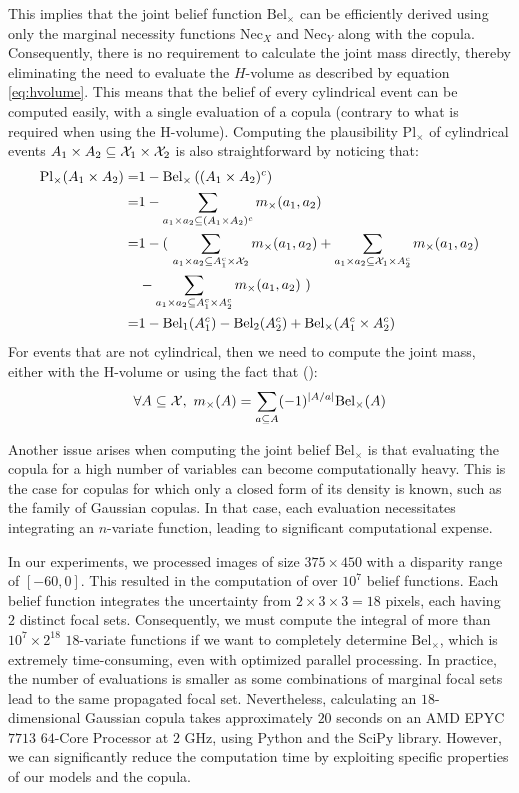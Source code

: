 This implies that the joint belief function $\mathrm{Bel}_\times$ can be efficiently derived using only the marginal necessity functions $\mathrm{Nec}_X$ and $\mathrm{Nec}_Y$ along with the copula. Consequently, there is no requirement to calculate the joint mass directly, thereby eliminating the need to evaluate the $H$-volume as described by equation \eqref{eq:hvolume}. This means that the belief of every cylindrical event can be computed easily, with a single evaluation of a copula (contrary to what is required when using the H-volume). Computing the plausibility $\mathrm{Pl}_\times$ of cylindrical events $A_1\times A_2\subseteq{\mathcal{X}}_1\times{\mathcal{X}}_2$ is also straightforward by noticing that:
\begin{align*}
    \mathrm{Pl}_\times(A_1\times A_2) =& 1-\mathrm{Bel}_\times\left((A_1\times A_2)^c\right)\\
    =& 1 - \sum_{a_1\times a_2\subseteq(A_1\times A_2)^c}m_\times(a_1,a_2)\\
    =& 1 - (~\sum_{a_1\times a_2\subseteq A_1^c\times {\mathcal{X}}_2}m_\times(a_1,a_2) + \sum_{a_1\times a_2\subseteq {\mathcal{X}}_1\times A_2^c}m_\times(a_1,a_2) \\
    &- \sum_{a_1\times a_2\subseteq A_1^c\times A_2^c}m_\times(a_1,a_2) ~)\\
    =& 1 - \mathrm{Bel}_1(A_1^c) - \mathrm{Bel}_2(A_2^c) + \mathrm{Bel}_\times(A_1^c\times A_2^c)
\end{align*}
For events that are not cylindrical, then we need to compute the joint mass, either with the H-volume or using the fact that (\cite{shafer_mathematical_1976}):
\begin{align}
    \forall A\subseteq{\mathcal{X}},~m_\times(A)=\sum_{a\subseteq A}(-1)^{|A/a|}\mathrm{Bel}_\times(A)\label{eq:bel_to_mass}
\end{align}

Another issue arises when computing the joint belief $\mathrm{Bel}_\times$ is that evaluating the copula for a high number of variables can become computationally heavy. This is the case for copulas for which only a closed form of its density is known, such as the family of Gaussian copulas. In that case, each evaluation necessitates integrating an $n$-variate function, leading to significant computational expense.

In our experiments, we processed images of size $375 \times 450$ with a disparity range of $[-60, 0]$. This resulted in the computation of over $10^7$ belief functions. Each belief function integrates the uncertainty from $2 \times 3 \times 3 = 18$ pixels, each having $2$ distinct focal sets. Consequently, we must compute the integral of more than $10^7 \times 2 ^{18}$ $18$-variate functions if we want to completely determine $\mathrm{Bel}_\times$, which is extremely time-consuming, even with optimized parallel processing. In practice, the number of evaluations is smaller as some combinations of marginal focal sets lead to the same propagated focal set. Nevertheless, calculating an $18$-dimensional Gaussian copula takes approximately $20$ seconds on an AMD EPYC $7713$ $64$-Core Processor at $2$ GHz, using Python and the SciPy library. However, we can significantly reduce the computation time by exploiting specific properties of our models and the copula.

